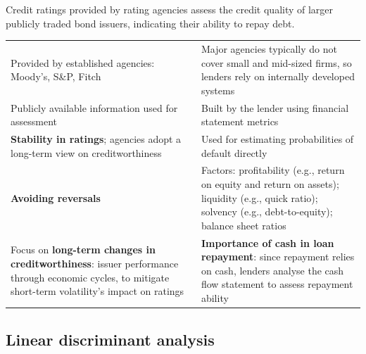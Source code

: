 
Credit ratings provided by rating agencies assess the credit quality of larger
publicly traded bond issuers, indicating their ability to repay debt.

\begin{center}
\footnotesize
\begin{tabular}{L{6.9cm} L{7.6cm}}
\toprule
{} &  \\
\midrule
Provided by established agencies: Moody's, S\&P, Fitch &
  Major agencies typically do not cover small and mid-sized firms, so lenders
  rely on internally developed systems \\
Publicly available information used for assessment &
  Built by the lender using financial statement metrics \\
\textbf{Stability in ratings}; agencies adopt a long-term view on
creditworthiness &
  Used for estimating probabilities of default directly \\
\textbf{Avoiding reversals} &
  Factors: profitability (e.g., return on equity and return on assets); liquidity
  (e.g., quick ratio); solvency (e.g., debt-to-equity); balance sheet ratios \\
Focus on \textbf{long-term changes in creditworthiness}: issuer performance
through economic cycles, to mitigate short-term volatility's impact on ratings &
  \textbf{Importance of cash in loan repayment}: since repayment relies on cash,
  lenders analyse the cash flow statement to assess repayment ability \\
\bottomrule
\end{tabular}
\end{center}


\subsection*{Linear discriminant analysis}

